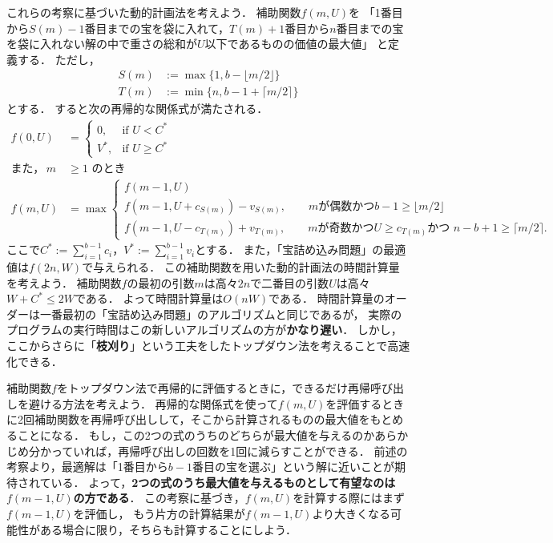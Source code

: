 \documentclass[a4paper,twoside,onecolumn,openany,article]{memoir}
\theoremstyle{remark}
\begin{document}
これらの考察に基づいた動的計画法を考えよう．
補助関数$f(m, U)$を
「1番目から$S(m)-1$番目までの宝を袋に入れて，$T(m)+1$番目から$n$番目までの宝を袋に入れない解の中で重さの総和が$U$以下であるものの価値の最大値」
と定義する．
ただし，
\begin{align*}
S(m)&:=\max\{1, b-\lfloor m/2\rfloor\}\\
T(m)&:=\min\{n, b-1+\lceil m/2\rceil\}
\end{align*}
とする．
すると次の再帰的な関係式が満たされる．
\begin{align*}
f(0,U)&=
\begin{cases}
0,& \text{if } U < C^*\\
V^*,& \text{if } U \ge C^*
\end{cases}\\
\text{また，}\, m&\ge 1\text{ のとき}\\
f(m,U)&= \max
\begin{cases}
f(m-1,U)\\
f(m-1,U+c_{S(m)})-v_{S(m)},\qquad\text{$m$が偶数かつ$b-1\ge \lfloor m/2\rfloor$}\\
f(m-1,U-c_{T(m)})+v_{T(m)},\qquad\text{$m$が奇数かつ$U\ge c_{T(m)}$かつ $n-b+1\ge \lceil m/2\rceil$.}
\end{cases}
\end{align*}
ここで$C^*:=\sum_{i=1}^{b-1} c_i$，$V^*:=\sum_{i=1}^{b-1} v_i$とする．
また，「宝詰め込み問題」の最適値は$f(2n,W)$で与えられる．
この補助関数を用いた動的計画法の時間計算量を考えよう．
補助関数$f$の最初の引数$m$は高々$2n$で二番目の引数$U$は高々$W+C^*\le 2W$である．
よって時間計算量は$O(nW)$である．
時間計算量のオーダーは一番最初の「宝詰め込み問題」のアルゴリズムと同じであるが，
実際のプログラムの実行時間はこの新しいアルゴリズムの方が\textbf{かなり遅い}．
しかし，ここからさらに「\textbf{枝刈り}」という工夫をしたトップダウン法を考えることで高速化できる．

補助関数$f$をトップダウン法で再帰的に評価するときに，できるだけ再帰呼び出しを避ける方法を考えよう．
再帰的な関係式を使って$f(m,U)$を評価するときに2回補助関数を再帰呼び出しして，そこから計算されるものの最大値をもとめることになる．
もし，この2つの式のうちのどちらが最大値を与えるのかあらかじめ分かっていれば，再帰呼び出しの回数を1回に減らすことができる．
前述の考察より，最適解は「1番目から$b-1$番目の宝を選ぶ」という解に近いことが期待されている．
よって，\textbf{2つの式のうち最大値を与えるものとして有望なのは$f(m-1,U)$の方である}．
この考察に基づき，$f(m,U)$を計算する際にはまず$f(m-1,U)$を評価し，
もう片方の計算結果が$f(m-1,U)$より大きくなる可能性がある場合に限り，そちらも計算することにしよう．
\end{document}

